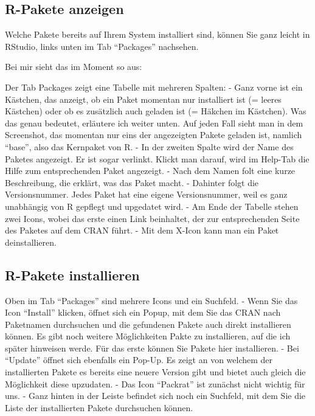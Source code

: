 \documentclass[
]{book}
\begin{document}
\hypertarget{r-pakete-anzeigen}{%
\subsection{R-Pakete anzeigen}\label{r-pakete-anzeigen}}

Welche Pakete bereits auf Ihrem System installiert sind, können Sie ganz leicht in RStudio, links unten im Tab ``Packages'' nachsehen.

Bei mir sieht das im Moment so aus:

Der Tab Packages zeigt eine Tabelle mit mehreren Spalten:
- Ganz vorne ist ein Kästchen, das anzeigt, ob ein Paket momentan nur installiert ist (= leeres Kästchen) oder ob es zusätzlich auch geladen ist (= Häkchen im Kästchen). Was das genau bedeutet, erläutere ich weiter unten. Auf jeden Fall sieht man in dem Screenshot, das momentan nur eins der angezeigten Pakete geladen ist, namlich ``base'', also das Kernpaket von R.
- In der zweiten Spalte wird der Name des Paketes angezeigt. Er ist sogar verlinkt. Klickt man darauf, wird im Help-Tab die Hilfe zum entsprechenden Paket angezeigt.
- Nach dem Namen folt eine kurze Beschreibung, die erklärt, was das Paket macht.
- Dahinter folgt die Versionsnummer. Jedes Paket hat eine eigene Versionsnummer, weil es ganz unabhängig von R gepflegt und upgedatet wird.
- Am Ende der Tabelle stehen zwei Icons, wobei das erste einen Link beinhaltet, der zur entsprechenden Seite des Paketes auf dem CRAN führt.
- Mit dem X-Icon kann man ein Paket deinstallieren.

\hypertarget{r-pakete-installieren}{%
\subsection{R-Pakete installieren}\label{r-pakete-installieren}}

Oben im Tab ``Packages'' sind mehrere Icons und ein Suchfeld.
- Wenn Sie das Icon ``Install'' klicken, öffnet sich ein Popup, mit dem Sie das CRAN nach Paketnamen durchsuchen und die gefundenen Pakete auch direkt installieren können. Es gibt noch weitere Möglichkeiten Pakte zu installieren, auf die ich später hinweisen werde. Für das erste können Sie Pakete hier installieren.
- Bei ``Update'' öffnet sich ebenfalls ein Pop-Up. Es zeigt an von welchem der installierten Pakete es bereits eine neuere Version gibt und bietet auch gleich die Möglichkeit diese upzudaten.
- Das Icon ``Packrat'' ist zunächst nicht wichtig für uns.
- Ganz hinten in der Leiste befindet sich noch ein Suchfeld, mit dem Sie die Liste der installierten Pakete durchsuchen können.
\end{document}

